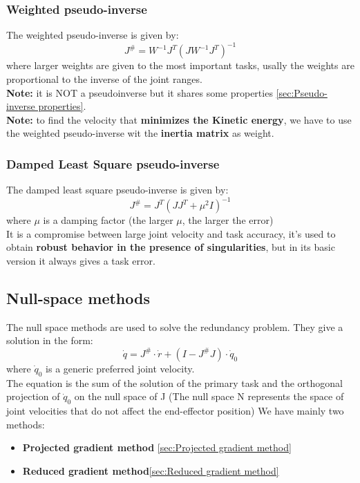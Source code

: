 \documentclass[a4paper,12pt]{article}
\begin{document}
\subsubsection{Weighted pseudo-inverse}\label{sec:Weighted pseudo-inverse}
The weighted pseudo-inverse is given by:
\begin{equation}
    J^\# = W^{-1} J^T(J W^{-1} J^T)^{-1}
\end{equation}
where larger weights are given to the most important tasks, usally 
the weights are proportional to the inverse of the joint ranges.\\
\textbf{Note:} it is NOT a pseudoinverse but it shares some properties \ref{sec:Pseudo-inverse properties}.\\
\textbf{Note:} to find the velocity that \textbf{minimizes the Kinetic energy}, we have to
use the weighted pseudo-inverse wit the \textbf{inertia matrix} as weight.

\subsubsection{Damped Least Square pseudo-inverse}\label{sec:Damped Least Square pseudo-inverse}
The damped least square pseudo-inverse is given by:
\begin{equation}
    J^\# = J^T(J J^T + \mu^2 I)^{-1}
\end{equation}
where $\mu$ is a damping factor (the larger $\mu$, the larger the error)\\
It is a compromise between
large joint velocity
and task accuracy, it's used to obtain \textbf{robust behavior in the
 presence of singularities},
but in its basic version it always gives a task error.
\subsection{Null-space methods}
The null space methods are used to solve the redundancy problem.
They give a solution in the form: \begin{equation}
    \dot{q} = J^\# \cdot \dot{r} + (I - J^\# J) \cdot \dot{q}_0
\end{equation}
where $\dot{q}_0$ is a generic preferred joint velocity.\\
The equation is the sum of the solution of the primary task 
and the orthogonal projection of $\dot{q}_0$ on the null space of J (The null space 
N represents the space of joint velocities that do not affect the end-effector position)
We have mainly two methods:
\begin{itemize}
    \item \textbf{Projected gradient method} \ref{sec:Projected gradient method}
   \item \textbf{Reduced gradient method}\ref{sec:Reduced gradient method}
\end{itemize}
\end{document}
